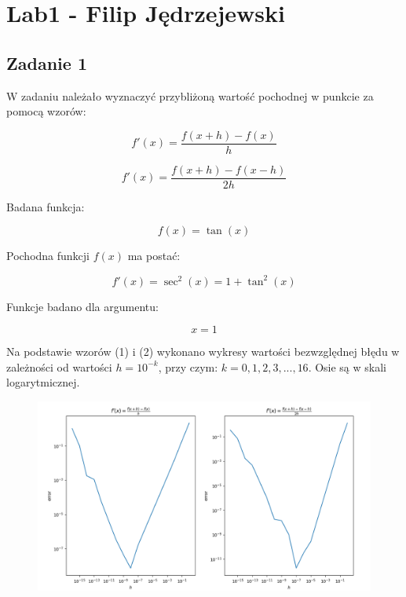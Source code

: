 \documentclass{article}
\begin{document}
	\section*{Lab1 - Filip Jędrzejewski}
	
	\subsection*{Zadanie 1}
	W zadaniu należało wyznaczyć przybliżoną wartość pochodnej w punkcie za pomocą wzorów:
	
	\begin{equation}
	f'(x) = \frac{f(x+h)-f(x)}{h}
	\end{equation}
	
	\begin{equation}
	f'(x) = \frac{f(x+h)-f(x-h)}{2h}
	\end{equation}
	
	Badana funkcja:
	
	\begin{equation}
	f(x) = \tan (x)
	\end{equation}
	
	Pochodna funkcji $f(x)$ ma postać:
	
	\begin{equation}
	f'(x) = \sec ^2 (x) = 1+\tan ^ 2 (x)
	\end{equation}
	
	Funkcje badano dla argumentu:
	
	$$x = 1$$
	
	Na podstawie wzorów (1) i (2) wykonano wykresy wartości bezwzględnej błędu w zależności od wartości $h = 10^{-k}$, przy czym: $k = 0,1,2,3,...,16$. Osie są w skali logarytmicznej.
	
	\begin{figure}[h]
    		\centering
  		\includegraphics[scale = 0.5]{zad1.png}
	\end{figure}
	
\end{document}
